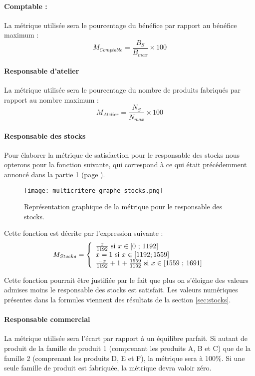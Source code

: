 \paragraph{Comptable :}
La métrique utilisée sera le pourcentage du bénéfice par rapport au bénéfice
maximum :
$$
M_{Comptable} = \frac{B_{S}}{B_{max}} \times 100
$$

\paragraph{Responsable d'atelier}
La métrique utilisée sera le pourcentage du nombre de produits fabriqués par
rapport au nombre maximum :
$$
M_{Atelier} = \frac{N_{S}}{N_{max}} \times 100
$$

\paragraph{Responsable des stocks}
Pour élaborer la métrique de satisfaction pour le responsable des stocks nous
opterons pour la fonction suivante, qui correspond à ce qui était précédemment
annoncé dans la partie 1 (page \pageref{sec:stocks}). 

\begin{figure}[!ht]
\begin{center}
    \texttt{[image: multicritere\_graphe\_stocks.png]}
    \vspace{-1cm}
    \caption{Représentation graphique de la métrique pour le responsable des
	stocks.}
	\end{center}
\end{figure}

Cette fonction est décrite par l'expression suivante :
$$
M_{Stocks} = \left\{ 
    \begin{array}{l l l}
	\frac{x}{1192} \text{ si } x \in \text{[0 ; 1192]} \\
	x=1 \text{ si } x \in [1192 ; 1559]\\
	\frac{-x}{1192}+ 1+\frac{1559}{1192} \text{ si } x \in \text{[1559 ;
	    1691]}\\
    \end{array}
\right.
$$

Cette fonction pourrait être justifiée par le fait que plus on s’éloigne des
valeurs admises moins le responsable des stocks est satisfait. Les valeurs
numériques présentes dans la formules viennent des résultats de la section
\ref{sec:stocks}.


\paragraph{Responsable commercial}
La métrique utilisée sera l'écart par rapport à un équilibre parfait.
Si autant de produit de la famille de produit 1 (comprenant les produits A, B
et C) que de la famille 2 (comprenant les produits D, E et F), la métrique sera
à 100\%.
Si une seule famille de produit est fabriquée, la métrique devra valoir zéro.

